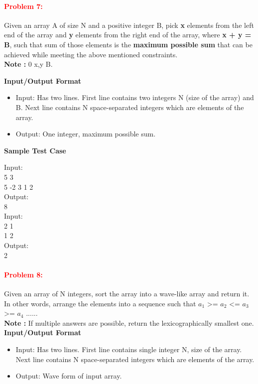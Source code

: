\documentclass[a4paper,11pt]{article} %
\begin{document}
\paragraph{\textcolor{red}{Problem 7: }}
Given an array A of size N and a positive integer B, pick \textbf{x} elements from the left end of the array and \textbf{y} elements from the right end of the array, where \textbf{x + y = B}, such that sum of those elements is the \textbf{maximum possible sum} that can be achieved while meeting the above mentioned constraints.\\
\textbf{Note : }0 \leq x,y \leq B.

\textbf{Input/Output Format}
\begin{itemize}
    \item  Input: Has two lines. First line contains two integers N (size of the array) and B. Next line contains N space-separated integers which are elements of the array.
    \item  Output: One integer, maximum possible sum.
\end{itemize}

\textbf{Sample Test Case}

Input:  \\
5 3\\
5 -2 3 1 2 \\
Output: \\
8\\

Input: \\
2 1\\
1 2 \\
Output: \\
2

\vspace*{0.3cm}

\paragraph{\textcolor{red}{Problem 8: }}
Given an array of N integers, sort the array into a wave-like array and return it. In other words, arrange the elements into a sequence such that $a_1$ >= $a_2$ <= $a_3$ >= $a_4$ ......\\
\textbf{Note : }If multiple answers are possible, return the lexicographically smallest one.\\
\textbf{Input/Output Format}
\begin{itemize}
    \item  Input: Has two lines. First line contains single integer N, size of the array. Next line contains N space-separated integers which are elements of the array.
    \item  Output: Wave form of input array.
\end{itemize}
\end{document}

